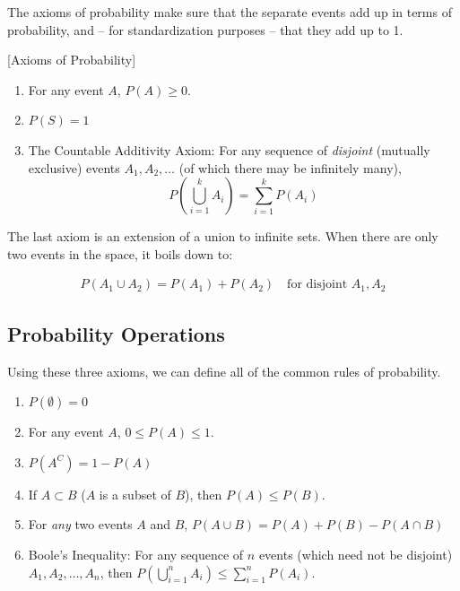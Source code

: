 \documentclass[]{book}
\providecommand{\tightlist}{%
  \setlength{\itemsep}{0pt}\setlength{\parskip}{0pt}}
\theoremstyle{definition}
\theoremstyle{definition}
\theoremstyle{definition}
\theoremstyle{remark}
\begin{document}
The axioms of probability make sure that the separate events add up in terms of probability, and -- for standardization purposes -- that they add up to 1.

[Axioms of Probability]
\protect\hypertarget{def:unnamed-chunk-67}{}{\label{def:unnamed-chunk-67} {} }

\begin{enumerate}
\def\labelenumi{\arabic{enumi}.}
\tightlist
\item
  For any event \(A\), \(P(A)\ge 0\).
\item
  \(P(S)=1\)
\item
  The Countable Additivity Axiom: For any sequence of \emph{disjoint} (mutually exclusive) events \(A_1,A_2,\ldots\) (of which there may be infinitely many), \[P\left( \bigcup\limits_{i=1}^k
  A_i\right)=\sum\limits_{i=1}^k P(A_i)\]
\end{enumerate}

The last axiom is an extension of a union to infinite sets. When there are only two events in the space, it boils down to:

\begin{align*}
P(A_1 \cup A_2) = P(A_1) + P(A_2) \quad\text{for disjoint } A_1, A_2
\end{align*}

\hypertarget{probability-operations}{%
\subsection*{Probability Operations}\label{probability-operations}}

Using these three axioms, we can define all of the common rules of probability.

\begin{enumerate}
\def\labelenumi{\arabic{enumi}.}
\tightlist
\item
  \(P(\emptyset)=0\)
\item
  For any event \(A\), \(0\le P(A) \le 1\).
\item
  \(P({A}^C)=1-P(A)\)
\item
  If \(A\subset B\) (\(A\) is a subset of \(B\)), then \(P(A)\le P(B)\).
\item
  For \emph{any} two events \(A\) and \(B\), \(P(A\cup B)=P(A)+P(B)-P(A\cap B)\)
\item
  Boole's Inequality: For any sequence of \(n\) events (which need not be disjoint) \(A_1,A_2,\ldots,A_n\), then \(P\left( \bigcup\limits_{i=1}^n A_i\right) \leq \sum\limits_{i=1}^n P(A_i)\).
\end{enumerate}
\end{document}
